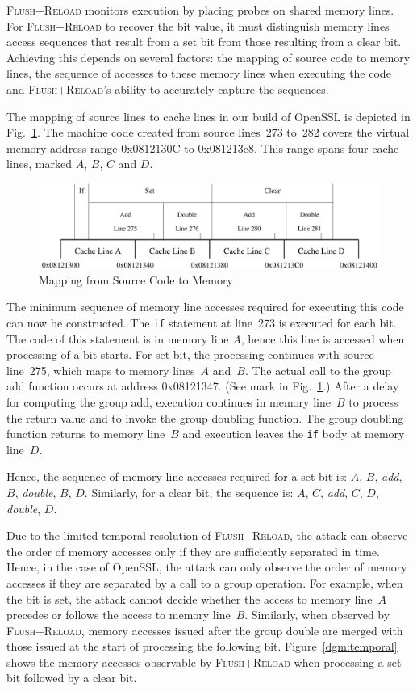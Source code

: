 \documentclass{llncs}
\begin{document}
\textsc{Flush+Reload} monitors execution by placing probes on shared memory lines.
For \textsc{Flush+Reload} to recover the bit value, it must distinguish memory lines access sequences
that result from a set bit from those resulting from a clear bit.
Achieving this depends on several factors: the mapping of source code to memory lines, 
the sequence of accesses to these memory lines when executing the code and 
\textsc{Flush+Reload}'s ability to accurately capture the sequences.


The mapping of source lines to cache lines in our build of OpenSSL is depicted in Fig.~\ref{dgm:memory}.
The machine code created from source lines~273 to~282 covers the virtual memory address range 0x0812130C
to 0x081213e8.
This range spans four cache lines, marked $A$, $B$, $C$ and $D$.


\begin{figure}[htb]
\centering\includegraphics[width=\columnwidth]{images/memory}
\caption{Mapping from Source Code to Memory\label{dgm:memory}}
\end{figure}


The minimum sequence of memory line accesses required for executing this code can now be constructed.
The \texttt{if} statement at line~273 is executed for each bit.  
The code of this statement is in memory line $A$, hence this line is accessed when processing of a bit starts.
For set bit, the processing continues with source line~275, which maps to memory lines~$A$ and~$B$.
The actual call to the group add function occurs at address 0x08121347.
(See mark in Fig.~\ref{dgm:memory}.)
After a delay for computing the group add, execution continues in memory line~$B$ to process the return value and 
to invoke the group doubling function.
The group doubling function returns to memory line~$B$ and execution leaves the \texttt{if} body at memory line~$D$.

Hence, the sequence of memory line accesses required for a set bit is: $A$, $B$, \textit{add}, $B$, \textit{double}, $B$, $D$.
Similarly, for a clear bit, the sequence is: $A$, $C$, \textit{add}, $C$, $D$, \textit{double}, $D$.

Due to the limited temporal resolution of \textsc{Flush+Reload}, the attack can observe the order of memory accesses only
if they are sufficiently separated in time.
Hence, in the case of OpenSSL, the attack can only observe the order of memory accesses if they are separated by a call
to a group operation.
For example, when the bit is set, the attack cannot decide whether the access to memory line~$A$ precedes or follows the access
to memory line~$B$.
Similarly, when observed by \textsc{Flush+Reload}, memory accesses issued after the group double are merged with those 
issued at the start of processing the following bit.
Figure~\ref{dgm:temporal} shows the memory accesses observable by \textsc{Flush+Reload} when processing a set bit followed by
a clear bit.
\end{document}
